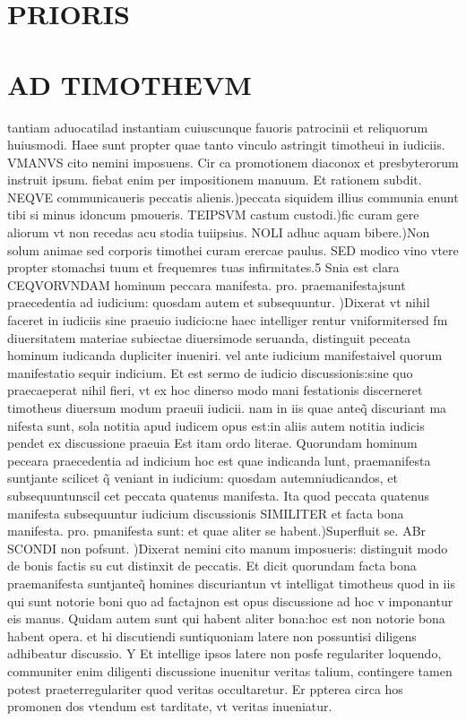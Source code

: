 \documentclass{article}
\begin{document}
\begin{pages}
\section*{PRIORIS }
\section*{AD TIMOTHEVM }\pstart tantiam aduocatilad instantiam cuiuscunque fauoris patrocinii et reliquorum huiusmodi. Haee sunt propter quae tanto vinculo astringit timotheui in iudiciis. VMANVS cito nemini imposuens. Cir ca promotionem diaconox et presbyterorum instruit ipsum. fiebat enim per impositionem manuum. Et rationem subdit. NEQVE communicaueris peccatis alienis.)peccata siquidem illius communia enunt tibi si minus idoncum pmoueris. TEIPSVM castum custodi.)fic curam gere aliorum vt non recedas acu stodia tuiipsius. NOLI adhuc aquam bibere.)Non solum animae sed corporis timothei curam erercae paulus. SED modico vino vtere propter stomachsi tuum et frequemres tuas infirmitates.5 Snia est clara CEQVORVNDAM hominum peccara manifesta. pro. praemanifestajsunt praecedentia ad iudicium: quosdam autem et subsequuntur. )Dixerat vt nihil faceret in iudiciis sine praeuio iudicio:ne haec intelliger rentur vniformitersed fm diuersitatem materiae subiectae diuersimode seruanda, distinguit peceata hominum iudicanda dupliciter inueniri. vel ante iudicium manifestaivel quorum manifestatio sequir indicium. Et est sermo de iudicio discussionis:sine quo praecaeperat nihil fieri, vt ex hoc dinerso modo mani festationis discerneret timotheus diuersum modum praeuii iudicii. nam in iis quae anteq̃ discuriant ma nifesta sunt, sola notitia apud iudicem opus est:in aliis autem notitia iudicis pendet ex discussione praeuia Est itam ordo literae. Quorundam hominum peceara praecedentia ad indicium hoc est quae indicanda lunt, praemanifesta suntjante scilicet q̃ veniant in iudicium: quosdam autemniudicandos, et subsequuntunscil cet peccata quatenus manifesta. Ita quod peccata quatenus manifesta subsequuntur iudicium discussionis SIMILITER et facta bona manifesta. pro. pmanifesta sunt: et quae aliter se habent.)Superfluit se. ABr SCONDI non pofsunt. )Dixerat nemini cito manum imposueris: distinguit modo de bonis factis su cut distinxit de peccatis. Et dicit quorundam facta bona praemanifesta suntjanteq̃ homines discuriantun vt intelligat timotheus quod in iis qui sunt notorie boni quo ad factajnon est opus discussione ad hoc v imponantur eis manus. Quidam autem sunt qui habent aliter bona:hoc est non notorie bona habent opera. et hi discutiendi suntiquoniam latere non possuntisi diligens adhibeatur discussio. Y Et intellige ipsos latere non posfe regulariter loquendo, communiter enim diligenti discussione inuenitur veritas talium, contingere tamen potest praeterregulariter quod veritas occultaretur. Er ppterea circa hos promonen dos vtendum est tarditate, vt veritas inueniatur.  \pend

\end{pages}
\end{document}
